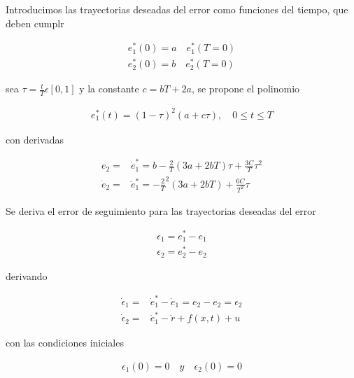 Introducimos las trayectorias deseadas del error como funciones del tiempo, que deben cumplr

\begin{equation}
\begin{aligned}
	e_1^*(0)=a \quad e_1^*(T=0)\\
	e_2^*(0)=b \quad e_2^*(T=0)
\end{aligned}
\end{equation}

sea $\tau=\frac{t}{T}\epsilon[0,1]$  y la constante $c=bT+2a$, se propone el polinomio

\begin{equation}
\begin{aligned}
	e_1^*(t)=(1-\tau)^2(a+c\tau),\quad 0 \leq t \leq T
\end{aligned}
\end{equation}

con derivadas

\begin{equation}
\begin{aligned}
	e_2=& \dot{e}_1^* = b - \frac{2}{T} (3a+2bT)\tau + \frac{3C}{T}\tau^2\\
	\dot{e}_2=&\ddot{e}_1^*= - \frac{2}{T}^2(3a+2bT)+\frac{6C}{T^2}\tau
\end{aligned}
\end{equation}

Se deriva el error de seguimiento para las trayectorias deseadas del error

\begin{equation}
\begin{aligned}
	\epsilon_1=e_1^*-e_1\\
	\epsilon_2=e_2^*-e_2
\end{aligned}
\end{equation}

derivando

\begin{equation}
\begin{aligned}
	\dot{\epsilon}_1=&\dot{e}_1^*-\dot{e}_1=e_2-e_2=\epsilon_2\\
	\dot{\epsilon}_2=&\ddot{e}_1^*-\ddot{r}+f(x,t)+u
\end{aligned}
\end{equation}

con las condiciones iniciales

\begin{equation}
\begin{aligned}
	\epsilon_1(0)=0 \quad  y \quad \epsilon_2(0)=0
\end{aligned}
\end{equation}
